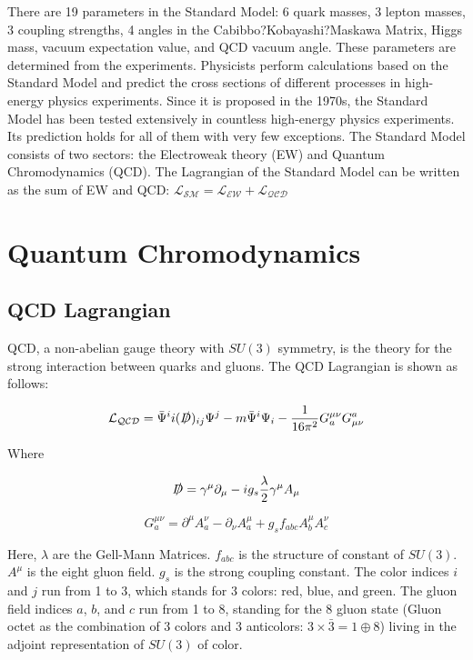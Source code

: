 There are 19 parameters in the Standard Model: 6 quark masses, 3 lepton masses, 3 coupling strengths, 4 angles in the Cabibbo?Kobayashi?Maskawa Matrix, Higgs mass, vacuum expectation value, and QCD vacuum angle. These parameters are determined from the experiments. Physicists perform calculations based on the Standard Model and predict the cross sections of different processes in high-energy physics experiments. Since it is proposed in the 1970s, the Standard Model has been tested extensively in countless high-energy physics experiments. Its prediction holds for all of them with very few exceptions. The Standard Model consists of two sectors: the Electroweak theory (EW) and Quantum Chromodynamics (QCD). The Lagrangian of the Standard Model can be written as the sum of EW and QCD: $\mathcal{L_{SM}} = \mathcal{L_{EW}} + \mathcal{L_{QCD}}$ 


\section{Quantum Chromodynamics}

\subsection{QCD Lagrangian}

QCD, a non-abelian gauge theory with $SU(3)$ symmetry, is the theory for the strong interaction between quarks and gluons. The QCD Lagrangian is shown as follows:


\begin{equation}
\mathcal{L_{QCD}} = \bar \Psi^i i (\slashed{D})_{ij} \Psi^j - m  \bar \Psi^i \Psi_i - \frac{1}{16\pi^2} G^{\mu\nu}_{a}G_{\mu\nu}^{a}
\end{equation}

Where 

\begin{equation}
\slashed{D} = \gamma^\mu \partial_\mu - i g_s \frac{\lambda}{2}  \gamma^\mu A_\mu
\end{equation}

\begin{equation}
G^{\mu\nu}_{a} = \partial^\mu A^\nu_{a} - \partial_{\nu} A^\mu_{a} + g_s f_{abc} A^\mu_b A^\nu_c 
\end{equation}

Here, $\lambda$ are the Gell-Mann Matrices. $f_{abc}$ is the structure of constant of $SU(3)$. $A^\mu$ is the eight gluon field. $g_s$ is the strong coupling constant. The color indices $i$ and $j$ run from 1 to 3, which stands for 3 colors: red, blue, and green. The gluon field indices $a$, $b$, and $c$ run from 1 to 8, standing for the 8 gluon state (Gluon octet as the combination of 3 colors and 3 anticolors: $3 \times \bar 3 = 1 \oplus 8$) living in the adjoint representation of $SU(3)$ of color.  



